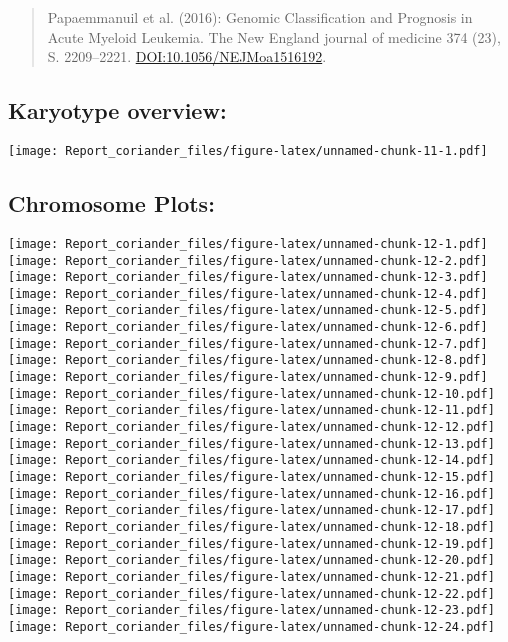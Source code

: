 \documentclass[]{article}
\begin{document}
\begin{quote}
Papaemmanuil et al. (2016): Genomic Classification and Prognosis in
Acute Myeloid Leukemia. The New England journal of medicine 374 (23), S.
2209--2221. \url{DOI:10.1056/NEJMoa1516192}.
\end{quote}

\hypertarget{karyotype-overview}{%
\subsection{Karyotype overview:}\label{karyotype-overview}}

\texttt{[image: Report\_coriander\_files/figure-latex/unnamed-chunk-11-1.pdf]}

\hypertarget{chromosome-plots}{%
\subsection{Chromosome Plots:}\label{chromosome-plots}}

\texttt{[image: Report\_coriander\_files/figure-latex/unnamed-chunk-12-1.pdf]}
\texttt{[image: Report\_coriander\_files/figure-latex/unnamed-chunk-12-2.pdf]}
\texttt{[image: Report\_coriander\_files/figure-latex/unnamed-chunk-12-3.pdf]}
\texttt{[image: Report\_coriander\_files/figure-latex/unnamed-chunk-12-4.pdf]}
\texttt{[image: Report\_coriander\_files/figure-latex/unnamed-chunk-12-5.pdf]}
\texttt{[image: Report\_coriander\_files/figure-latex/unnamed-chunk-12-6.pdf]}
\texttt{[image: Report\_coriander\_files/figure-latex/unnamed-chunk-12-7.pdf]}
\texttt{[image: Report\_coriander\_files/figure-latex/unnamed-chunk-12-8.pdf]}
\texttt{[image: Report\_coriander\_files/figure-latex/unnamed-chunk-12-9.pdf]}
\texttt{[image: Report\_coriander\_files/figure-latex/unnamed-chunk-12-10.pdf]}
\texttt{[image: Report\_coriander\_files/figure-latex/unnamed-chunk-12-11.pdf]}
\texttt{[image: Report\_coriander\_files/figure-latex/unnamed-chunk-12-12.pdf]}
\texttt{[image: Report\_coriander\_files/figure-latex/unnamed-chunk-12-13.pdf]}
\texttt{[image: Report\_coriander\_files/figure-latex/unnamed-chunk-12-14.pdf]}
\texttt{[image: Report\_coriander\_files/figure-latex/unnamed-chunk-12-15.pdf]}
\texttt{[image: Report\_coriander\_files/figure-latex/unnamed-chunk-12-16.pdf]}
\texttt{[image: Report\_coriander\_files/figure-latex/unnamed-chunk-12-17.pdf]}
\texttt{[image: Report\_coriander\_files/figure-latex/unnamed-chunk-12-18.pdf]}
\texttt{[image: Report\_coriander\_files/figure-latex/unnamed-chunk-12-19.pdf]}
\texttt{[image: Report\_coriander\_files/figure-latex/unnamed-chunk-12-20.pdf]}
\texttt{[image: Report\_coriander\_files/figure-latex/unnamed-chunk-12-21.pdf]}
\texttt{[image: Report\_coriander\_files/figure-latex/unnamed-chunk-12-22.pdf]}
\texttt{[image: Report\_coriander\_files/figure-latex/unnamed-chunk-12-23.pdf]}
\texttt{[image: Report\_coriander\_files/figure-latex/unnamed-chunk-12-24.pdf]}
\end{document}
